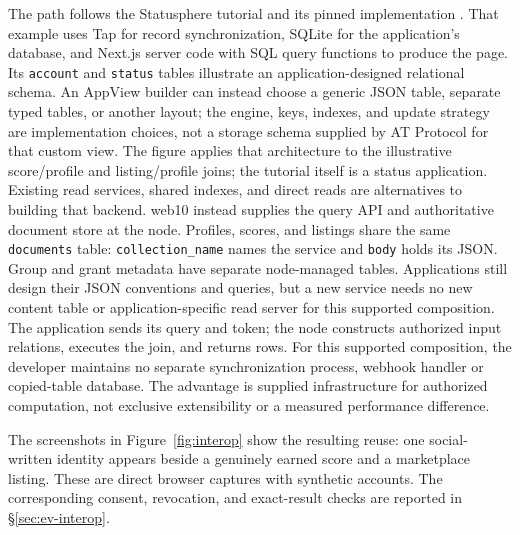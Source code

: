 \documentclass[sigconf, nonacm]{acmart}
\begin{document}
The path follows the Statusphere tutorial and its pinned implementation
\cite{at-statusphere,at-statusphere-source}. That example uses Tap for
record synchronization, SQLite for the application's database, and
Next.js server code with SQL query functions to produce the page.
Its \texttt{account} and \texttt{status} tables illustrate an
application-designed relational schema. An AppView builder can instead
choose a generic JSON table, separate typed tables, or another layout;
the engine, keys, indexes, and update strategy are implementation choices,
not a storage schema supplied by AT Protocol for that custom view.
The figure applies that architecture to the illustrative score/profile
and listing/profile joins; the tutorial itself is a status application.
Existing read services, shared indexes, and direct reads are alternatives
to building that backend. web10 instead supplies the query API and
authoritative document store at the node. Profiles, scores, and listings
share the same \texttt{documents} table: \texttt{collection\_name} names
the service and \texttt{body} holds its JSON. Group and grant metadata have
separate node-managed tables. Applications still design their JSON
conventions and queries, but a new service needs no new content table or
application-specific read server for this supported composition.
The application sends its query
and token; the node constructs authorized input relations, executes the
join, and returns rows. For this supported composition, the developer
maintains no separate synchronization process, webhook handler or
copied-table database. The advantage is supplied infrastructure for
authorized computation, not exclusive extensibility or a measured
performance difference.

The screenshots in Figure~\ref{fig:interop} show the resulting reuse:
one social-written identity appears beside a genuinely earned score and
a marketplace listing. These are direct browser captures with synthetic
accounts. The corresponding consent, revocation, and exact-result
checks are reported in \S\ref{sec:ev-interop}.
\end{document}
